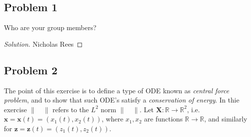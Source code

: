 \documentclass{article}
\newcommand{\R}{{\mathbb R}}
\begin{document}
\subsection*{Problem 1}
Who are your group members?
\begin{proof}[Solution]\let\qed\relax
	Nicholas Rees
\end{proof}


\subsection*{Problem 2}
The point of this exercise is to define a type of ODE known as \emph{central force problem},
and to show that such ODE's satisfy a \emph{conservation of energy}.
In thie exercise $\lVert \quad \rVert$ refers to the $L^2$ norm $\lVert \quad \rVert$.
Let $\mathbf{X} \colon \R \to \R^2$, i.e. $\mathbf{x} = \mathbf{x}(t) = (x_1(t),x_2(t))$,
where $x_1,x_2$ are functions $\R \to \R$, and similarly for
$\mathbf{z} = \mathbf{z}(t) = (z_1(t),z_2(t))$.
\end{document}

